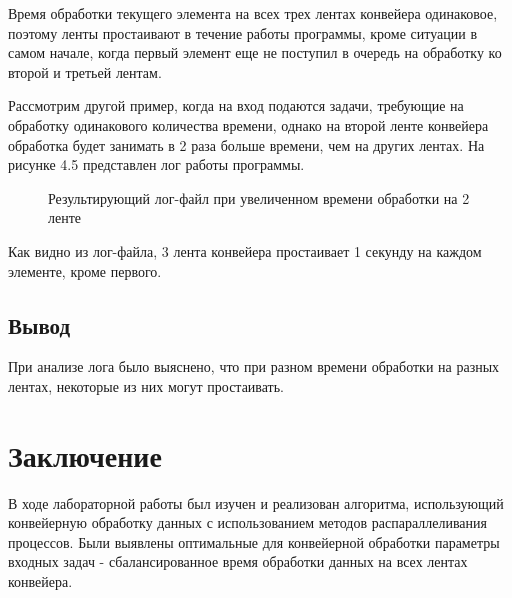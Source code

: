 \documentclass[a4paper,12pt]{report}
\begin{document}
Время обработки текущего элемента на всех трех лентах конвейера одинаковое,  поэтому ленты простаивают в течение работы программы, кроме ситуации в самом начале, когда первый элемент еще не поступил в очередь на обработку ко второй и третьей лентам. 

Рассмотрим другой пример, когда на вход подаются задачи, требующие на обработку одинакового количества времени, однако на второй ленте конвейера обработка будет занимать в 2 раза больше времени, чем на других лентах. На рисунке 4.5 представлен лог работы программы.

\begin{figure}[ht!]
\caption{Результирующий лог-файл при увеличенном времени обработки на 2 ленте}
\end{figure}

Как видно из лог-файла, 3 лента конвейера простаивает 1 секунду на каждом элементе, кроме первого.

\section{Вывод}
\hspace{0.6cm} При анализе лога было выяснено, что при разном времени обработки на разных лентах, некоторые из них могут простаивать.

\newpage
\chapter*{Заключение}
\hspace{0.6cm}В ходе лабораторной работы был изучен и реализован алгоритма, использующий конвейерную обработку данных с использованием методов распараллеливания процессов. Были выявлены оптимальные для конвейерной обработки параметры входных задач - сбалансированное время обработки данных на всех лентах конвейера.    
\end{document}
